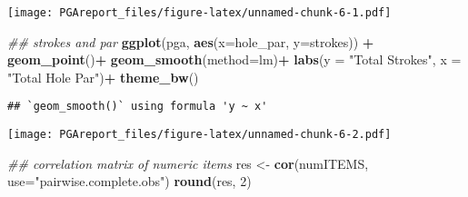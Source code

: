 \documentclass[
]{article}
\newenvironment{Shaded}{\begin{snugshade}}{\end{snugshade}}
\newcommand{\CommentTok}[1]{\textcolor[rgb]{0.56,0.35,0.01}{\textit{#1}}}
\newcommand{\DataTypeTok}[1]{\textcolor[rgb]{0.13,0.29,0.53}{#1}}
\newcommand{\DecValTok}[1]{\textcolor[rgb]{0.00,0.00,0.81}{#1}}
\newcommand{\KeywordTok}[1]{\textcolor[rgb]{0.13,0.29,0.53}{\textbf{#1}}}
\newcommand{\NormalTok}[1]{#1}
\newcommand{\OperatorTok}[1]{\textcolor[rgb]{0.81,0.36,0.00}{\textbf{#1}}}
\newcommand{\StringTok}[1]{\textcolor[rgb]{0.31,0.60,0.02}{#1}}
\begin{document}
\texttt{[image: PGAreport\_files/figure-latex/unnamed-chunk-6-1.pdf]}

\begin{Shaded}
\begin{Highlighting}[]
\CommentTok{## strokes and par }
\KeywordTok{ggplot}\NormalTok{(pga, }\KeywordTok{aes}\NormalTok{(}\DataTypeTok{x=}\NormalTok{hole_par, }\DataTypeTok{y=}\NormalTok{strokes)) }\OperatorTok{+}\StringTok{ }
\StringTok{  }\KeywordTok{geom_point}\NormalTok{()}\OperatorTok{+}
\StringTok{  }\KeywordTok{geom_smooth}\NormalTok{(}\DataTypeTok{method=}\NormalTok{lm)}\OperatorTok{+}
\StringTok{  }\KeywordTok{labs}\NormalTok{(}\DataTypeTok{y =} \StringTok{"Total Strokes"}\NormalTok{, }\DataTypeTok{x =} \StringTok{"Total Hole Par"}\NormalTok{)}\OperatorTok{+}
\StringTok{  }\KeywordTok{theme_bw}\NormalTok{()  }
\end{Highlighting}
\end{Shaded}

\begin{verbatim}
## `geom_smooth()` using formula 'y ~ x'
\end{verbatim}

\texttt{[image: PGAreport\_files/figure-latex/unnamed-chunk-6-2.pdf]}

\begin{Shaded}
\begin{Highlighting}[]
\CommentTok{## correlation matrix of numeric items}
\NormalTok{res <-}\StringTok{ }\KeywordTok{cor}\NormalTok{(numITEMS, }\DataTypeTok{use=}\StringTok{"pairwise.complete.obs"}\NormalTok{)}
\KeywordTok{round}\NormalTok{(res, }\DecValTok{2}\NormalTok{)}
\end{Highlighting}
\end{Shaded}
\end{document}
